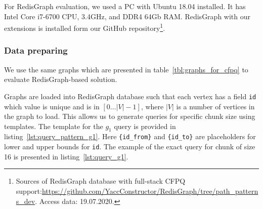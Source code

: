 For RedisGraph evaluation, we used a PC with Ubuntu 18.04 installed.
It has Intel Core i7-6700 CPU, 3.4GHz, and DDR4 64Gb RAM. 
RedisGraph with our extensions is installed form our GitHub repository\footnote{Sources of RedisGraph database with full-stack CFPQ support:\url{https://github.com/YaccConstructor/RedisGraph/tree/path_patterns_dev}. Access data: 19.07.2020.}. 

\subsubsection{Data preparing}

We use the same graphs which are presented in table~\ref{tbl:graphs_for_cfpq} to evaluate RedisGraph-based solution.

Graphs are loaded into RedisGraph database such that each vertex has a field \verb|id| which value is unique and is in $[0 \ldots |V|-1]$, where $|V|$ is a number of vertices in the graph to load.
This allows us to generate queries for specific chunk size using templates.
The template for the $g_1$ query is provided in listing~\ref{lst:query_pattern_g1}.
Here \texttt{\{id\_from\}} and \texttt{\{id\_to\}} are placeholders for lower and upper bounds for \verb|id|. The example of the exact query for chunk of size 16 is presented in listing~\ref{lst:query_g1}.

\begin{algorithm}
\end{algorithm}

\begin{algorithm}
\end{algorithm}

